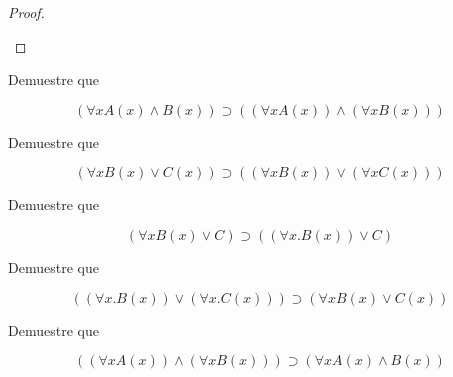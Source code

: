 \documentclass{article}
\begin{document}
\begin{example}
\begin{proof}
        \begin{prooftree}
        \end{prooftree}
    \end{proof}
\end{example}

\begin{example}
    Demuestre que

    $$
        (\forall x A(x) \land B(x)) \supset ((\forall x A (x)) \land (\forall x B (x)))
    $$
\end{example}

\begin{example}
    Demuestre que

    $$
        (\forall x B(x) \lor C(x)) \supset ((\forall x B(x)) \lor (\forall x C(x)))
    $$
\end{example}

\begin{example}
    Demuestre que

    $$
        (\forall x B(x) \lor C) \supset ((\forall x. B(x)) \lor C)
    $$
\end{example}

\begin{example}
    Demuestre que

    $$
        ((\forall x. B(x)) \lor (\forall x . C(x))) \supset (\forall x B(x) \lor C(x))
    $$
\end{example}


\begin{exercise}
    Demuestre que

    $$
        ((\forall x A (x)) \land (\forall x B (x))) \supset (\forall x A(x) \land B(x))
    $$
\end{exercise}
\end{document}
